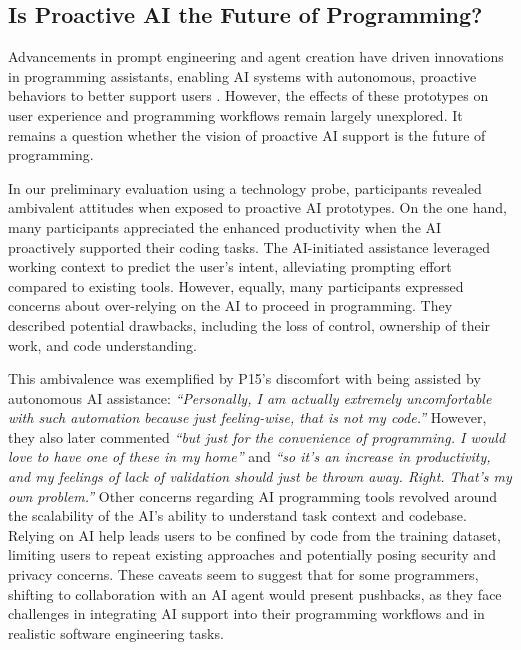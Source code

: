 \subsection{Is Proactive AI the Future of Programming?}
Advancements in prompt engineering and agent creation have driven innovations in programming assistants, enabling AI systems with autonomous, proactive behaviors to better support users \cite{ross2023programmerassistant, copilotX, cursorcopilot++, geniusbydiagram, devinAISWE, wang2024opendevinopenplatformai, yang2024sweagentagentcomputerinterfacesenable}.
However, the effects of these prototypes on user experience and programming workflows remain largely unexplored.
It remains a question whether the vision of proactive AI support is the future of programming. 

In our preliminary evaluation using a technology probe, participants revealed ambivalent attitudes when exposed to proactive AI prototypes.
On the one hand, many participants appreciated the enhanced productivity when the AI proactively supported their coding tasks.
The AI-initiated assistance leveraged working context to predict the user's intent, alleviating prompting effort compared to existing tools.
However, equally, many participants expressed concerns about over-relying on the AI to proceed in programming.
They described potential drawbacks, including the loss of control, ownership of their work, and code understanding.

This ambivalence was exemplified by P15's discomfort with being assisted by autonomous AI assistance:
\textit{``Personally, I am actually extremely uncomfortable with such automation because just feeling-wise, that is not my code.''} 
However, they also later commented \textit{``but just for the convenience of programming. I would love to have one of these in my home''} and \textit{``so it's an increase in productivity, and my feelings of lack of validation should just be thrown away. Right. That's my own problem.''}
Other concerns regarding AI programming tools revolved around the scalability of the AI's ability to understand task context and codebase.
Relying on AI help leads users to be confined by code from the training dataset, limiting users to repeat existing approaches and potentially posing security and privacy concerns.
These caveats seem to suggest that for some programmers, shifting to collaboration with an AI agent would present pushbacks, as they face challenges in integrating AI support into their programming workflows and in realistic software engineering tasks.

